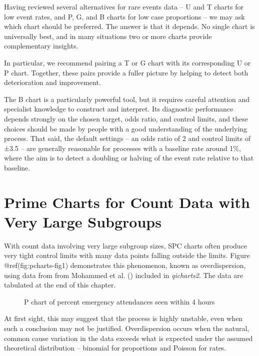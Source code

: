 \documentclass[
]{book}
\makeatletter
\newcommand*\pandocbounded[1]{%
  \sbox\pandoc@box{#1}%
  \Gscale@div\@tempa{\textheight}{\dimexpr\ht\pandoc@box+\dp\pandoc@box\relax}%
  \Gscale@div\@tempb{\linewidth}{\wd\pandoc@box}%
  \ifdim\@tempb\p@<\@tempa\p@\let\@tempa\@tempb\fi%
  \ifdim\@tempa\p@<\p@\scalebox{\@tempa}{\usebox\pandoc@box}%
  \else\usebox{\pandoc@box}%
  \fi%
}
\makeatother
\begin{document}
Having reviewed several alternatives for rare events data -- U and T
charts for low event rates, and P, G, and B charts for low case
proportions -- we may ask which chart should be preferred. The answer is
that it depends. No single chart is universally best, and in many
situations two or more charts provide complementary insights.

In particular, we recommend pairing a T or G chart with its
corresponding U or P chart. Together, these pairs provide a fuller
picture by helping to detect both deterioration and improvement.

The B chart is a particularly powerful tool, but it requires careful
attention and specialist knowledge to construct and interpret. Its
diagnostic performance depends strongly on the chosen target, odds
ratio, and control limits, and these choices should be made by people
with a good understanding of the underlying process. That said, the
default settings -- an odds ratio of 2 and control limits of ±3.5 -- are
generally reasonable for processes with a baseline rate around 1\%,
where the aim is to detect a doubling or halving of the event rate
relative to that baseline.

\chapter{Prime Charts for Count Data with Very Large
Subgroups}\label{prime-charts-for-count-data-with-very-large-subgroups}

With count data involving very large subgroup sizes, SPC charts often
produce very tight control limits with many data points falling outside
the limits. Figure @ref(fig:pcharts-fig1) demonstrates this phenomenon,
known as overdispersion, using data from from Mohammed et al.
() included in \emph{qicharts2}. The
data are tabulated at the end of this chapter.

\begin{figure}
\centering
\pandocbounded{}
\caption{P chart of percent emergency attendances seen within 4 hours}
\end{figure}

At first sight, this may suggest that the process is highly unstable,
even when such a conclusion may not be justified. Overdispersion occurs
when the natural, common cause variation in the data exceeds what is
expected under the assumed theoretical distribution -- binomial for
proportions and Poisson for rates.
\end{document}
